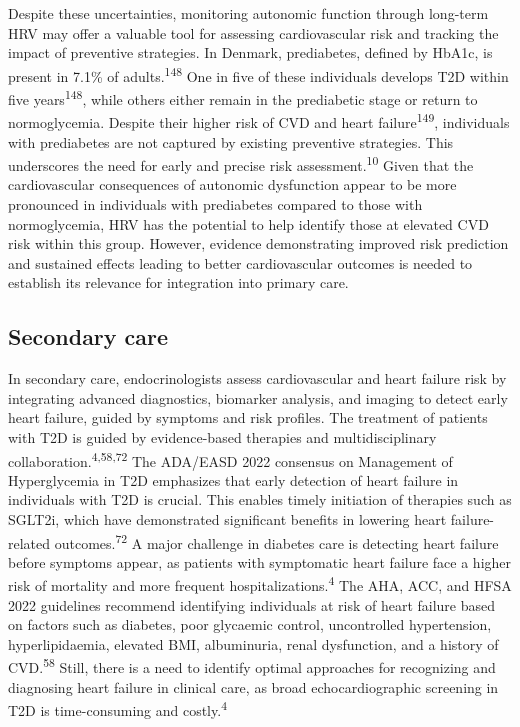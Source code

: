 \documentclass[
  letterpaper,
  headsepline=true,
  open=any]{scrbook}
\begin{document}
Despite these uncertainties, monitoring autonomic function through
long-term HRV may offer a valuable tool for assessing cardiovascular
risk and tracking the impact of preventive strategies. In Denmark,
prediabetes, defined by HbA1c, is present in 7.1\% of
adults.\textsuperscript{148} One in five of these individuals develops
T2D within five years\textsuperscript{148}, while others either remain
in the prediabetic stage or return to normoglycemia. Despite their
higher risk of CVD and heart failure\textsuperscript{149}, individuals
with prediabetes are not captured by existing preventive strategies.
This underscores the need for early and precise risk
assessment.\textsuperscript{10} Given that the cardiovascular
consequences of autonomic dysfunction appear to be more pronounced in
individuals with prediabetes compared to those with normoglycemia, HRV
has the potential to help identify those at elevated CVD risk within
this group. However, evidence demonstrating improved risk prediction and
sustained effects leading to better cardiovascular outcomes is needed to
establish its relevance for integration into primary care.

\hypertarget{secondary-care}{%
\subsection{Secondary care}\label{secondary-care}}

In secondary care, endocrinologists assess cardiovascular and heart
failure risk by integrating advanced diagnostics, biomarker analysis,
and imaging to detect early heart failure, guided by symptoms and risk
profiles. The treatment of patients with T2D is guided by evidence-based
therapies and multidisciplinary collaboration.\textsuperscript{4,58,72}
The ADA/EASD 2022 consensus on Management of Hyperglycemia in T2D
emphasizes that early detection of heart failure in individuals with T2D
is crucial. This enables timely initiation of therapies such as SGLT2i,
which have demonstrated significant benefits in lowering heart
failure-related outcomes.\textsuperscript{72} A major challenge in
diabetes care is detecting heart failure before symptoms appear, as
patients with symptomatic heart failure face a higher risk of mortality
and more frequent hospitalizations.\textsuperscript{4} The AHA, ACC, and
HFSA 2022 guidelines recommend identifying individuals at risk of heart
failure based on factors such as diabetes, poor glycaemic control,
uncontrolled hypertension, hyperlipidaemia, elevated BMI, albuminuria,
renal dysfunction, and a history of CVD.\textsuperscript{58} Still,
there is a need to identify optimal approaches for recognizing and
diagnosing heart failure in clinical care, as broad echocardiographic
screening in T2D is time-consuming and costly.\textsuperscript{4}
\end{document}
